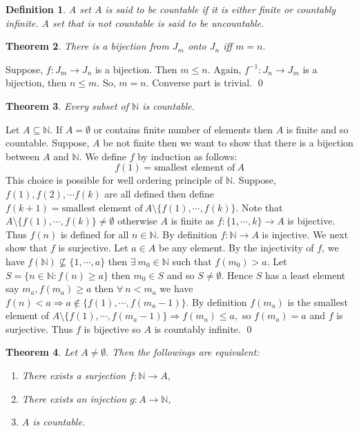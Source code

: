 \documentclass[11pt]{amsart}
\newtheorem{theorem}{Theorem}[section]
\newtheorem{definition}[theorem]{Definition}%
\newcommand{\NN}{\mathbb N}
\begin{document}
\begin{definition}
A set $A$ is said to be countable if it is either finite or countably infinite. A set that is not countable is said to be uncountable.
\end{definition}
\begin{theorem}
There is a bijection from $J_m$ onto $J_n$ iff $m=n.$
\end{theorem}
\proof Suppose, $f:J_m\to J_n$ is a bijection. Then $m\leq n.$ Again, $f^{-1}:J_n\to J_m$ is a bijection, then $n\leq m.$ So, $m=n.$ Converse part is trivial. \qed
\begin{theorem}
Every subset of ${\NN}$ is countable.
\end{theorem}
\proof Let $A\subseteq {\NN}$. If $A=\emptyset$ or contains finite number of elements then $A$ is finite and so countable. Suppose, $A$ be not finite then we want to show that there is a bijection between $A$ and ${\NN}.$ We define $f$ by induction as follows: $$f(1)=\text{smallest element of}~A$$ This choice is possible for well ordering principle of ${\NN}.$ Suppose, $f(1),f(2),\cdots f(k)$ are all defined then define $f(k+1)=\text{smallest element of}~A\setminus \{f(1),\cdots ,f(k)\}.$ Note that $A\setminus \{f(1),\cdots ,f(k)\}\neq \emptyset$ otherwise $A$ is finite as $f:\{1,\cdots ,k\}\to A$ is bijective. Thus $f(n)$ is defined for all $n\in {\NN}.$ By definition $f:{\NN}\to A$ is injective. We next show that $f$ is surjective. Let $a\in A$ be any element. By the injectivity of $f$, we have $f({\NN})\nsubseteq \{1,\cdots,a\}$ then $\exists~m_0\in {\NN}$ such that $f(m_0)>a$. Let $S=\{n\in {\NN}:f(n)\geq a\}$ then $m_0\in S$ and so $S\neq \emptyset.$ Hence $S$ has a least element say $m_a,f(m_a)\geq a$ then $\forall~n<m_a$ we have $f(n)<a \Rightarrow a\notin \{f(1),\cdots,f(m_a-1)\}.$ By definition $f(m_a)$ is the smallest element of $A\setminus \{f(1),\cdots,f(m_a-1)\} \Rightarrow f(m_a)\leq a,$ so $f(m_a)=a$ and $f$ is surjective. Thus $f$ is bijective so $A$ is countably infinite. \qed

\begin{theorem}
Let $A\neq \emptyset.$ Then the followings are equivalent: \begin{enumerate}
\item There exists a surjection $f:{\NN}\to A$,
\item There exists an injection $g:A\to {\NN}$,
\item $A$ is countable.
\end{enumerate}
\end{theorem}
\proof 
\end{document}
